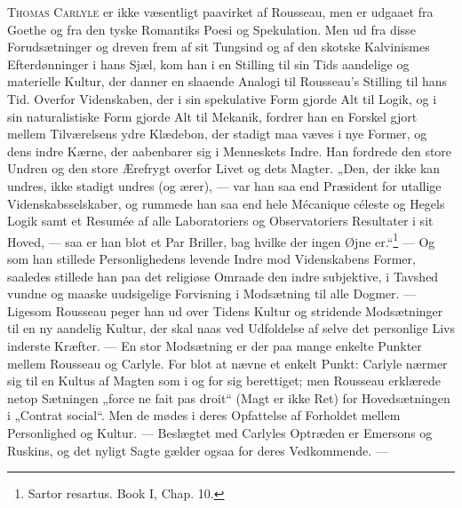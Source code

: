 \documentclass[12pt,a4paper,openany]{book}
\newcommand{\opage}[1]{\marginnote{\footnotesize\textit{[#1]}}}
\begin{document}
\textsc{Thomas Carlyle} er ikke væsentligt paavirket af Rousseau,
men er udgaaet fra Goethe og fra den tyske Romantiks Poesi
og Spekulation. Men ud fra disse Forudsætninger og dreven
frem af sit Tungsind og af den skotske Kalvinismes Efterdønninger
i hans Sjæl, kom han i en Stilling til sin Tids aandelige
og materielle Kultur, der danner en slaaende Analogi til Rousseau’s
Stilling til hans Tid. Overfor Videnskaben, der i sin spekulative
Form gjorde Alt til Logik, og i sin naturalistiske Form
gjorde Alt til Mekanik, fordrer han en Forskel gjort mellem
Tilværelsens ydre Klædebon, der stadigt maa væves i nye Former,
\setcounter{footnote}{0}%
\opage{126}og dens indre Kærne, der aabenbarer sig i Menneskets Indre.
Han fordrede den store Undren og den store Ærefrygt overfor
Livet og dets Magter. „Den, der ikke kan undres, ikke stadigt
undres (og ærer), --- var han saa end Præsident for utallige
Videnskabsselskaber, og rummede han saa end hele Mécanique
céleste og Hegels Logik samt et Resumée af alle Laboratoriers
og Observatoriers Resultater i sit Hoved, --- saa er han blot
et Par Briller, bag hvilke der ingen Øjne er.“\footnote[1]{Sartor resartus. Book I, Chap. 10.} --- Og som han
stillede Personlighedens levende Indre mod Videnskabens Former,
saaledes stillede han paa det religiøse Omraade den indre subjektive,
i Tavshed vundne og maaske uudsigelige Forvisning i
Modsætning til alle Dogmer. --- Ligesom Rousseau peger han
ud over Tidens Kultur og stridende Modsætninger til en ny
aandelig Kultur, der skal naas ved Udfoldelse af selve det personlige
Livs inderste Kræfter. --- En stor Modsætning er der
paa mange enkelte Punkter mellem Rousseau og Carlyle. For
blot at nævne et enkelt Punkt: Carlyle nærmer sig til en Kultus
af Magten som i og for sig berettiget; men Rousseau erklærede
netop Sætningen „force ne fait pas droit“ (Magt er ikke
Ret) for Hovedsætningen i „Contrat social“. Men de mødes i
deres Opfattelse af Forholdet mellem Personlighed og Kultur.
--- Beslægtet med Carlyles Optræden er Emersons og Ruskins,
og det nyligt Sagte gælder ogsaa for deres Vedkommende. ---
\end{document}
